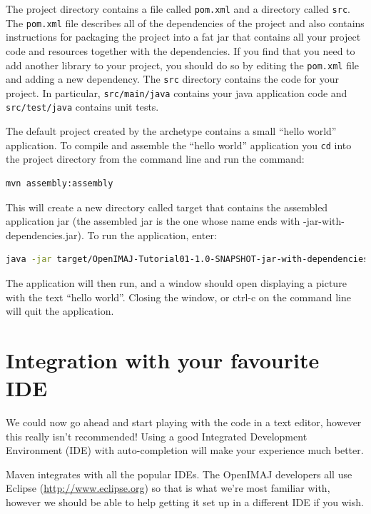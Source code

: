 \documentclass[10pt,a4paper,twoside,extrafontsizes]{memoir}
\begin{document}
The project directory contains a file called \verb+pom.xml+ and a directory called \verb+src+. 
The \verb+pom.xml+ file describes all of the dependencies of the project and also contains 
instructions for packaging the project into a fat jar that contains all your project code and 
resources together with the dependencies. If you find that you need to add another library to 
your project, you should do so by editing the \verb+pom.xml+ file and adding a new dependency. 
The \verb+src+ directory contains the code for your project. In particular, \verb+src/main/java+ 
contains your java application code and \verb+src/test/java+ contains unit tests.

The default project created by the archetype contains a small ``hello world'' application. To 
compile and assemble the ``hello world'' application you \verb+cd+ into the project directory 
from the command line and run the command:
\begin{lstlisting}[language=bash]
mvn assembly:assembly
\end{lstlisting}
This will create a new directory called target that contains the assembled application jar 
(the assembled jar is the one whose name ends with -jar-with-dependencies.jar). To run the 
application, enter:
\begin{lstlisting}[language=bash]
java -jar target/OpenIMAJ-Tutorial01-1.0-SNAPSHOT-jar-with-dependencies.jar
\end{lstlisting}
The application will then run, and a window should open displaying a picture with the text 
``hello world''. Closing the window, or ctrl-c on the command line will quit the application.

\section*{Integration with your favourite IDE}
We could now go ahead and start playing with the code in a text editor, however this really 
isn't recommended! Using a good Integrated Development Environment (IDE) with auto-completion will 
make your experience much better.

Maven integrates with all the popular IDEs. The OpenIMAJ developers all use Eclipse 
(\url{http://www.eclipse.org}) so that is what we're most familiar with, however we should be able 
to help getting it set up in a different IDE if you wish. 
\end{document}
